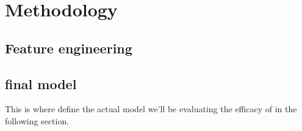 \section{Methodology}
\label{sec:-method}

\subsection{Feature engineering}
\subsection{final model}
This is where define the actual model we'll be evaluating the efficacy 
of in the following section.
